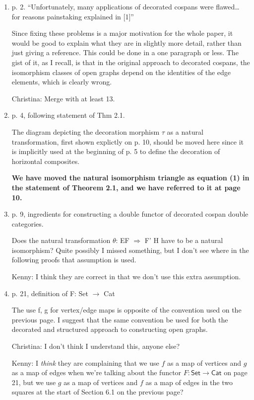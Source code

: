 \documentclass[reqno]{amsart}
\def\chris{\color{purple} Christina: }
\def\kenny{\color{blue} Kenny: }
\begin{document}
\begin{enumerate}
{\chris Third review starts here}
\item p. 2. “Unfortunately, many applications of decorated cospans were flawed… for reasons painstaking explained in [1]”

Since fixing these problems is a major motivation for the whole paper, it would be good to explain what they are in slightly more detail, rather than 
just giving a reference. This could be done in a one paragraph or less. The gist of it, as I recall, is that in the original approach to decorated 
cospans, the isomorphism classes of open graphs depend on the identities of the edge elements, which is clearly wrong.

{\chris Merge with at least 13.}

\item p. 4, following statement of Thm 2.1.

The diagram depicting the decoration morphism $\tau$ as a natural transformation, first shown explictly on p. 10, should be moved here since it is 
implicitly used at the beginning of p. 5 to define the decoration of horizontal composites.

{\bf We have moved the natural isomorphism triangle as equation (1) in the statement of Theorem 2.1, and we have referred to it at page 10.}

\item p. 9, ingredients for constructing a double functor of decorated cospan double categories.

Does the natural transformation $\theta$: EF $\Rightarrow$ F’ H have to be a natural isomorphism? Quite possibly I missed something, but I don’t see 
where in 
the following proofs that assumption is used.

{\kenny I think they are correct in that we don't use this extra assumption.}

\item p. 21, definition of F: Set $\to$ Cat

The use f, g for vertex/edge maps is opposite of the convention used on the previous page. I suggest that the same convention be used for both the 
decorated and structured approach to constructing open graphs.

{\chris I don't think I understand this, anyone else?}

{\kenny I \emph{think} they are complaining that we use $f$ as a map of vertices and $g$ as a map of edges when we're talking about the functor $F \colon \mathsf{Set} \to \mathsf{Cat}$ on page 21, but we use $g$ as a map of vertices and $f$ as a map of edges in the two squares at the start of Section 6.1 on the previous page?}


\end{enumerate}
\end{document}
